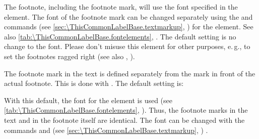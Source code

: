 \BeginIndexGroup
{}%
%
The%
 footnote, including the footnote mark, will use the font specified in the
 element. The
font of the footnote mark
can be changed separately using the 
 and
 commands (see
\autoref{sec:\ThisCommonLabelBase.textmarkup},
)
for the 
element. See also \autoref{tab:\ThisCommonLabelBase.fontelements},
.
The default setting is no change to the font.%
 Please don't misuse this element for other purposes, e.\,g., to set the
footnotes ragged right (see also ,
).

%
%
The footnote mark in the text is defined separately from the mark in
front of the actual footnote. This is done with
. The default setting is:
\begin{lstcode}
\end{lstcode}
With this default, the font for the 
element is used (see \autoref{tab:\ThisCommonLabelBase.fontelements},
). Thus, the footnote marks
in the text and in the footnote itself are identical. The font can be changed
with the commands  and
 (see
\autoref{sec:\ThisCommonLabelBase.textmarkup},
)%
.

